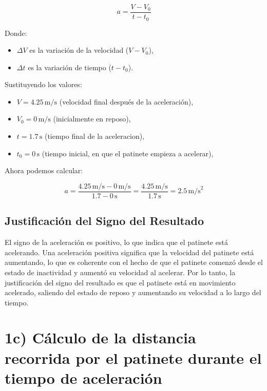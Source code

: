 \documentclass{article}
\begin{document}
\[
a = \frac{V - V_0}{t - t_0}
\]

Donde:
\begin{itemize}
    \item \(\Delta V\) es la variación de la velocidad (\(V - V_0\)),
    \item \(\Delta t\) es la variación de tiempo (\(t - t_0\)).
\end{itemize}

Sustituyendo los valores:

\begin{itemize}
    \item \(V = 4.25 \, \text{m/s}\) (velocidad final después de la aceleración),
    \item \(V_0 = 0 \, \text{m/s}\) (inicialmente en reposo),
    \item \(t = 1.7 \, \text{s}\) (tiempo final de la aceleracion),
    \item \(t_0 = 0 \, \text{s}\) (tiempo inicial, en que el patinete empieza a acelerar),

\end{itemize}

Ahora podemos calcular:

\[
a = \frac{4.25 \, \text{m/s} - 0 \, \text{m/s}}{1.7 - 0 \, \text{s}} = \frac{4.25 \, \text{m/s}}{1.7 \, \text{s}} = 2.5 \, \text{m/s}^2
\]

\subsection*{Justificación del Signo del Resultado}

El signo de la aceleración es positivo, lo que indica que el patinete está acelerando. Una aceleración positiva significa que la velocidad del patinete está aumentando, lo que es coherente con el hecho de que el patinete comenzó desde el estado de inactividad y aumentó su velocidad al acelerar. Por lo tanto, la justificación del signo del resultado es que el patinete está en movimiento acelerado, saliendo del estado de reposo y aumentando su velocidad a lo largo del tiempo.








\section*{1c) Cálculo de la distancia recorrida por el patinete durante el tiempo de aceleración}
\end{document}

